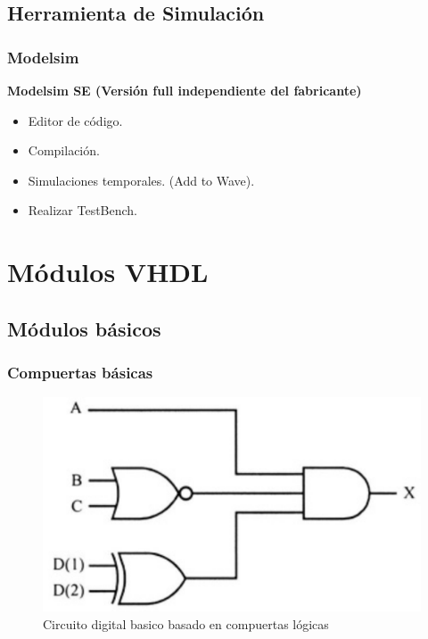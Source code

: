 \documentclass{beamer}
\begin{document}
\subsection{Herramienta de Simulación}
\begin{frame}
\frametitle{Modelsim}
\textbf{Modelsim SE (Versión full independiente del fabricante)}
\begin{itemize}
 \item Editor de código.
 \item Compilación.
 \item Simulaciones temporales. (Add to Wave).
 \item Realizar TestBench.
\end{itemize}

\end{frame}

\section{Módulos VHDL}
\subsection{Módulos básicos}
\begin{frame}
\frametitle{Compuertas básicas}
\begin{figure}[h]
  \centering
    \includegraphics[width=.6\textwidth]{graficos/compuertas.png}
  \caption{Circuito digital basico basado en compuertas lógicas}
  \label{compuertas}
\end{figure}
\end{frame}
\end{document}
